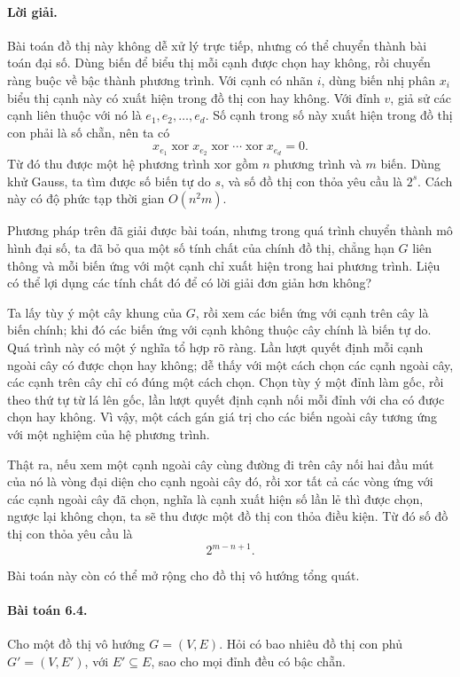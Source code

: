 \documentclass[11pt]{article}
\begin{document}
\paragraph{Lời giải.}
Bài toán đồ thị này không dễ xử lý trực tiếp, nhưng có thể chuyển thành bài
toán đại số. Dùng biến để biểu thị mỗi cạnh được chọn hay không, rồi chuyển
ràng buộc về bậc thành phương trình. Với cạnh có nhãn \(i\), dùng biến nhị phân
\(x_i\) biểu thị cạnh này có xuất hiện trong đồ thị con hay không. Với đỉnh
\(v\), giả sử các cạnh liên thuộc với nó là \(e_1,e_2,\ldots,e_d\). Số cạnh
trong số này xuất hiện trong đồ thị con phải là số chẵn, nên ta có
\[
  x_{e_1}\operatorname{xor}x_{e_2}\operatorname{xor}\cdots
  \operatorname{xor}x_{e_d}=0.
\]
Từ đó thu được một hệ phương trình xor gồm \(n\) phương trình và \(m\) biến.
Dùng khử Gauss, ta tìm được số biến tự do \(s\), và số đồ thị con thỏa yêu cầu
là \(2^s\). Cách này có độ phức tạp thời gian \(O(n^2m)\).

Phương pháp trên đã giải được bài toán, nhưng trong quá trình chuyển thành mô
hình đại số, ta đã bỏ qua một số tính chất của chính đồ thị, chẳng hạn \(G\)
liên thông và mỗi biến ứng với một cạnh chỉ xuất hiện trong hai phương trình.
Liệu có thể lợi dụng các tính chất đó để có lời giải đơn giản hơn không?

Ta lấy tùy ý một cây khung của \(G\), rồi xem các biến ứng với cạnh trên cây là
biến chính; khi đó các biến ứng với cạnh không thuộc cây chính là biến tự do.
Quá trình này có một ý nghĩa tổ hợp rõ ràng. Lần lượt quyết định mỗi cạnh ngoài
cây có được chọn hay không; dễ thấy với một cách chọn các cạnh ngoài cây, các
cạnh trên cây chỉ có đúng một cách chọn. Chọn tùy ý một đỉnh làm gốc, rồi theo
thứ tự từ lá lên gốc, lần lượt quyết định cạnh nối mỗi đỉnh với cha có được
chọn hay không. Vì vậy, một cách gán giá trị cho các biến ngoài cây tương ứng
với một nghiệm của hệ phương trình.

Thật ra, nếu xem một cạnh ngoài cây cùng đường đi trên cây nối hai đầu mút của
nó là vòng đại diện cho cạnh ngoài cây đó, rồi xor tất cả các vòng ứng với các
cạnh ngoài cây đã chọn, nghĩa là cạnh xuất hiện số lần lẻ thì được chọn, ngược
lại không chọn, ta sẽ thu được một đồ thị con thỏa điều kiện. Từ đó số đồ thị
con thỏa yêu cầu là
\[
  2^{m-n+1}.
\]

Bài toán này còn có thể mở rộng cho đồ thị vô hướng tổng quát.

\paragraph{Bài toán 6.4.}
Cho một đồ thị vô hướng \(G=(V,E)\). Hỏi có bao nhiêu đồ thị con phủ
\(G'=(V,E')\), với \(E'\subseteq E\), sao cho mọi đỉnh đều có bậc chẵn.
\end{document}
